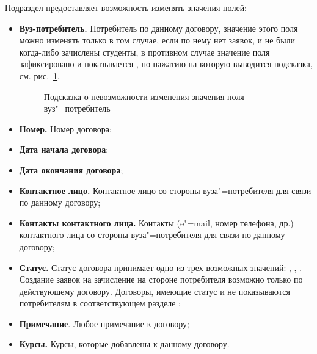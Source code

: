 Подраздел предоставляет возможность изменять значения полей:
\begin{itemize}
	\item \textbf{Вуз-потребитель.} Потребитель по данному договору, значение этого поля можно изменять только в том случае, если по нему нет заявок, и не были когда-либо зачислены студенты, в противном случае значение поля зафиксировано и показывается , по нажатию на которую выводится подсказка, см. рис.~\ref{agreement:consumer_help}.

\begin{figure}[H]
	\caption{Подсказка о невозможности изменения значения поля вуз"=потребитель}
	\label{agreement:consumer_help}
\end{figure}
	\item \textbf{Номер.} Номер договора;
	\item \textbf{Дата начала договора};
	\item \textbf{Дата окончания договора};
	\item \textbf{Контактное лицо.} Контактное лицо со стороны вуза"=потребителя для связи по данному договору;
	\item \textbf{Контакты контактного лица.} Контакты (e"=mail, номер телефона, др.) контактного лица со стороны вуза"=потребителя для связи по данному договору;
	\item \textbf{Статус.} Статус договора принимает одно из трех возможных значений: ,  ,  . Создание заявок на зачисление на стороне потребителя возможно только по действующему договору. Договоры, имеющие статус   и  не показываются потребителям в соответствующем разделе ;
	\item \textbf{Примечание}. Любое примечание к договору;
	\item \textbf{Курсы.} Курсы, которые добавлены к данному договору.
\end{itemize}

